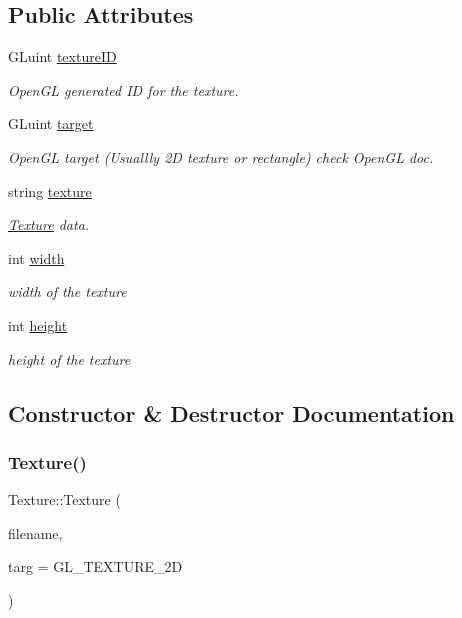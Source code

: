 \subsection*{Public Attributes}
\begin{DoxyCompactItemize}
\item 
G\+Luint \mbox{\hyperlink{classTexture_ab61a414e1ed356a30c48952d65227691}{texture\+ID}}
\begin{DoxyCompactList}\small\item\em Open\+GL generated ID for the texture. \end{DoxyCompactList}\item 
G\+Luint \mbox{\hyperlink{classTexture_adc0777da3ba92545967d6cf9b8d14926}{target}}
\begin{DoxyCompactList}\small\item\em Open\+GL target (Usuallly 2D texture or rectangle) check Open\+GL doc. \end{DoxyCompactList}\item 
string \mbox{\hyperlink{classTexture_a3b01478de1035e39ed6c88f12a0d6c1c}{texture}}
\begin{DoxyCompactList}\small\item\em \mbox{\hyperlink{classTexture}{Texture}} data. \end{DoxyCompactList}\item 
int \mbox{\hyperlink{classTexture_a06a0246cb31343557c3441c5733349cd}{width}}
\begin{DoxyCompactList}\small\item\em width of the texture \end{DoxyCompactList}\item 
int \mbox{\hyperlink{classTexture_ad37c395c65ff8bde86230908027a6fcd}{height}}
\begin{DoxyCompactList}\small\item\em height of the texture \end{DoxyCompactList}\end{DoxyCompactItemize}


\subsection{Constructor \& Destructor Documentation}
\mbox{\label{classTexture_aa063ccdd7622f00e20e1646ce3ef6dce}} 
\subsubsection{\texorpdfstring{Texture()}{Texture()}}
{\footnotesize\ttfamily Texture\+::\+Texture (\begin{DoxyParamCaption}\item[{const char $\ast$}]{filename,  }\item[{G\+Luint}]{targ = {\ttfamily GL\+\_\+TEXTURE\+\_\+2D} }\end{DoxyParamCaption})}

